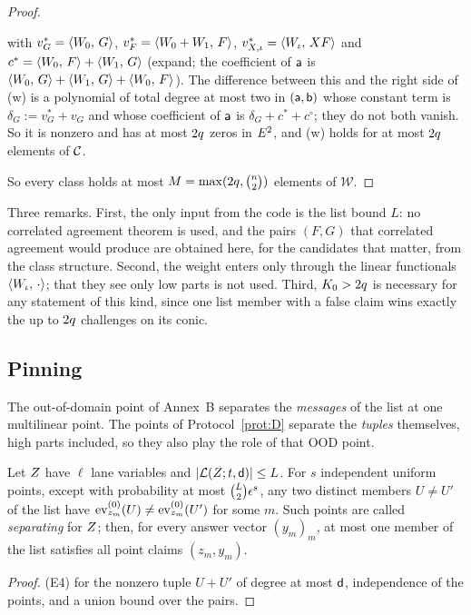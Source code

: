 \begin{proof}
\begin{itemize}[itemsep=1pt,topsep=2pt]
\begin{itemize}[itemsep=1pt,topsep=1pt]
\[\]
with $v^\ast_G=\langle W_0,\, G \rangle$, $v^\ast_F=\langle W_0+W_1,\, F \rangle$, $v^\ast_{X,\iota}=\langle W_\iota,\, XF \rangle$ and $c^\ast=\langle W_0,\, F \rangle+\langle W_1,\, G \rangle$ (expand; the coefficient of $\mathsf{a}$ is $\langle W_0,\, G \rangle+\langle W_1,\, G \rangle+\langle W_0,\, F \rangle$). The difference between this and the right side of (w) is a polynomial of total degree at most two in $(\mathsf{a},\mathsf{b})$ whose constant term is $\delta_G:=v^\ast_G+v_G$ and whose coefficient of $\mathsf{a}$ is $\delta_G+c^\ast+c^\circ$; they do not both vanish. So it is nonzero and has at most $2q$ zeros in $E^2$, and (w) holds for at most $2q$ elements of $\mathcal{C}$.
\end{itemize}
\end{itemize}
So every class holds at most $M=\max(2q,\binom{n}2)$ elements of $\mathcal W$.
\end{proof}

Three remarks. First, the only input from the code is the list bound $L$: no correlated agreement theorem is used, and the pairs $(F,G)$ that correlated agreement would produce are obtained here, for the candidates that matter, from the class structure. Second, the weight enters only through the linear functionals $\langle W_\iota,\, \cdot \rangle$; that they see only low parts is not used. Third, $K_0>2q$ is necessary for any statement of this kind, since one list member with a false claim wins exactly the up to $2q$ challenges on its conic.

\subsection{Pinning}\label{sec:P}

The out-of-domain point of Annex~B separates the \emph{messages} of the list at one multilinear point. The points of Protocol~\ref{prot:D} separate the \emph{tuples} themselves, high parts included, so they also play the role of that OOD point.

\begin{lemma}[Pinning]\label{lem:P}
Let $Z$ have $\ell$ lane variables and $|\mathcal{L}(Z;t,\mathsf{d})|\le L$. For $s$ independent uniform points, except with probability at most $\binom{L}{2}\epsilon^s$, any two distinct members $U\ne U'$ of the list have $\operatorname{ev}^{(0)}_{z_m}(U)\ne\operatorname{ev}^{(0)}_{z_m}(U')$ for some $m$. Such points are called \emph{separating} for $Z$; then, for every answer vector $(y_m)_m$, at most one member of the list satisfies all point claims $(z_m,y_m)$.
\end{lemma}
\begin{proof}
(E4) for the nonzero tuple $U+U'$ of degree at most $\mathsf{d}$, independence of the points, and a union bound over the pairs.
\end{proof}


